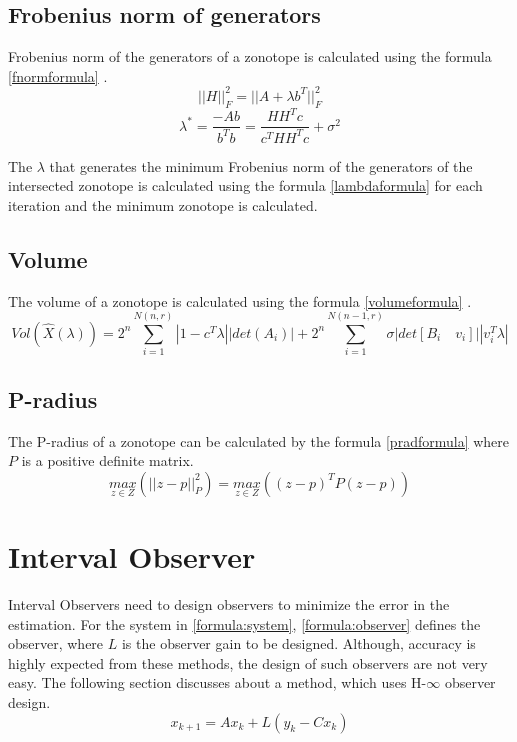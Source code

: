 \subsection{Frobenius norm of generators}
Frobenius norm of the generators of a zonotope is calculated using the formula \eqref{fnormformula} \cite{Alamo2005}.
\begin{equation}
\label{fnormformula}
||H||_{F}^2 = ||A + \lambda b^T||^{2}_F
\end{equation}
\begin{equation}
\label{lambdaformula}
\lambda^* = \frac{-Ab }{b^Tb}  = \frac{HH^Tc}{c^T HH^Tc} + \sigma^2
\end{equation}

The $\lambda$ that generates the minimum Frobenius norm of the generators of the intersected zonotope is calculated using the formula \eqref{lambdaformula} for each iteration and the minimum zonotope is calculated.

\subsection{Volume}
The volume of a zonotope is calculated using the formula \eqref{volumeformula} \cite{Alamo2005}.
\begin{equation}
\label{volumeformula}
Vol(\hat{X}(\lambda)) = 2^n \sum^{N(n,r)}_{i=1} |1- c^T \lambda||det(A_i)| + 2^n \sum^{N(n-1,r)}_{i=1} \sigma|det[B_i \quad v_i]||v_i^T\lambda|
\end{equation}

\subsection{P-radius}
The P-radius of a zonotope can be calculated by the formula \eqref{pradformula} where $P$ is a positive definite matrix.
\begin{equation}
\label{pradformula}
\underset{z \in Z}{max} (||z - p||^2_{P}) = \underset{z \in Z}{max}((z-p)^T P (z-p))
\end{equation}

\section{Interval Observer}
Interval Observers need to design observers to minimize the error in the estimation. For the system in \eqref{formula:system}, \eqref{formula:observer} defines the observer, where $L$ is the observer gain to be designed. Although, accuracy is highly expected from these methods, the design of such observers are not very easy. The following section discusses about a method, which uses H-$\infty$ observer design.
\begin{equation}
\label{formula:observer}
x_{k+1} = Ax_k + L(y_k -Cx_k)
\end{equation}

